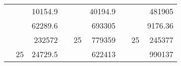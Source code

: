 \begin{table}[H]
\begin{tabular}{|ccrccrccc}
\rowcolor[HTML]{DAE8FC} 
\multicolumn{1}{|c|}{\cellcolor[HTML]{FFFFC7}}                                & \multicolumn{1}{c|}{\cellcolor[HTML]{DAE8FC}}                      & \multicolumn{1}{r|}{\cellcolor[HTML]{DAE8FC}10154.9}   & \multicolumn{1}{c|}{\cellcolor[HTML]{FFFFC7}}                                & \multicolumn{1}{c|}{\cellcolor[HTML]{DAE8FC}}                       & \multicolumn{1}{r|}{\cellcolor[HTML]{DAE8FC}40194.9}   & \multicolumn{1}{c|}{\cellcolor[HTML]{FFFFC7}}                                & \multicolumn{1}{c|}{\cellcolor[HTML]{DAE8FC}}                      & \multicolumn{1}{r|}{\cellcolor[HTML]{DAE8FC}481905}    \\ \cline{3-3} \cline{6-6} \cline{9-9} 
\multicolumn{1}{|c|}{\cellcolor[HTML]{FFFFC7}}                                & \multicolumn{1}{c|}{\cellcolor[HTML]{DAE8FC}}                      & \multicolumn{1}{r|}{\cellcolor[HTML]{DDFDFF}62289.6}   & \multicolumn{1}{c|}{\cellcolor[HTML]{FFFFC7}}                                & \multicolumn{1}{c|}{\cellcolor[HTML]{DAE8FC}}                       & \multicolumn{1}{r|}{\cellcolor[HTML]{DDFDFF}693305}    & \multicolumn{1}{c|}{\cellcolor[HTML]{FFFFC7}}                                & \multicolumn{1}{c|}{\cellcolor[HTML]{DAE8FC}}                      & \multicolumn{1}{r|}{\cellcolor[HTML]{DDFDFF}9176.36}   \\ \cline{3-3} \cline{6-6} \cline{9-9} 
\rowcolor[HTML]{DAE8FC} 
\multicolumn{1}{|c|}{\cellcolor[HTML]{FFFFC7}}                                & \multicolumn{1}{c|}{\cellcolor[HTML]{DAE8FC}}                      & \multicolumn{1}{r|}{\cellcolor[HTML]{DAE8FC}232572}    & \multicolumn{1}{c|}{\cellcolor[HTML]{FFFFC7}}                                & \multicolumn{1}{c|}{\multirow{-9}{*}{\cellcolor[HTML]{DAE8FC}25}}   & \multicolumn{1}{r|}{\cellcolor[HTML]{DAE8FC}779359}    & \multicolumn{1}{c|}{\cellcolor[HTML]{FFFFC7}}                                & \multicolumn{1}{c|}{\multirow{-9}{*}{\cellcolor[HTML]{DAE8FC}25}}  & \multicolumn{1}{r|}{\cellcolor[HTML]{DAE8FC}245377}    \\ \cline{3-3} \cline{5-6} \cline{8-9} 
\multicolumn{1}{|c|}{\cellcolor[HTML]{FFFFC7}}                                & \multicolumn{1}{c|}{\multirow{-10}{*}{\cellcolor[HTML]{DAE8FC}25}} & \multicolumn{1}{r|}{\cellcolor[HTML]{DDFDFF}24729.5}   & \multicolumn{1}{c|}{\cellcolor[HTML]{FFFFC7}}                                & \multicolumn{1}{c|}{\cellcolor[HTML]{DDFDFF}}                       & \multicolumn{1}{r|}{\cellcolor[HTML]{DAE8FC}622413}    & \multicolumn{1}{c|}{\cellcolor[HTML]{FFFFC7}}                                & \multicolumn{1}{c|}{\cellcolor[HTML]{DDFDFF}}                      & \multicolumn{1}{r|}{\cellcolor[HTML]{DAE8FC}990137}    \\ \cline{2-3} \cline{6-6} \cline{9-9} 

\end{tabular}
\end{table}
